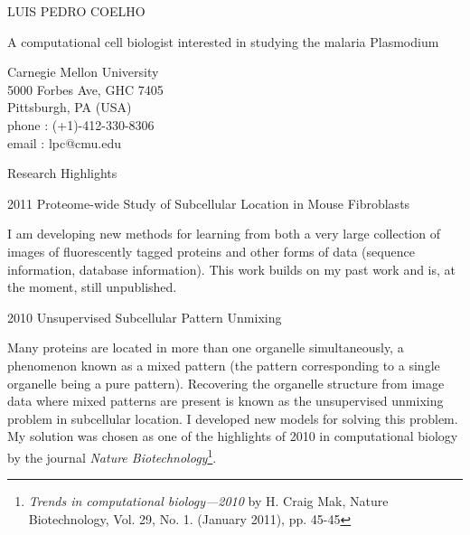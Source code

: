 \documentclass{article}
\renewcommand\section[1]{%
    \par\vspace{2em}%
    {\subhead #1}%
    \par\vspace{1em}%
}
\newcommand\cvitem[2][\relax]{%
    \par\vspace{.8em}
    \if\relax#1\else\textsc{#1}\hspace{1em}\fi%
    {\Textblack #2}%
    \par\vspace{.4em}
}
\begin{document}
\parindent=0cm

\begin{minipage}[t]{0.60\linewidth}%
\head \textcolor{darkg}{LUIS PEDRO COELHO}

\begin{minipage}[t]{0.70\linewidth}%
\raggedright\Quote\color{darkg} A computational cell biologist interested in studying the malaria Plasmodium
\end{minipage}
\end{minipage}
\hfill
\begin{minipage}[t]{0.26\textwidth}%
\vspace{-2.2em}
{\Contact%
\textcolor{medg}{
Carnegie Mellon University\\
5000 Forbes Ave, GHC 7405\\
Pittsburgh, PA (USA)}\\
\textcolor{darkg}{phone} : (+1)-412-330-8306\\
\textcolor{darkg}{email} : lpc@cmu.edu
}
\end{minipage}

\vspace{2.3em}

\section{Research Highlights}
\Text

\cvitem[2011]{Proteome-wide Study of Subcellular Location in Mouse Fibroblasts}
I am developing new methods for learning from both a very large collection of
images of fluorescently tagged proteins and other forms of data (sequence
information, database information). This work builds on my past work and is, at
the moment, still unpublished.

\cvitem[2010]{Unsupervised Subcellular Pattern Unmixing}
Many proteins are located in more than one organelle simultaneously, a
phenomenon known as a mixed pattern (the pattern corresponding to a single
organelle being a pure pattern). Recovering the organelle structure from image
data where mixed patterns are present is known as the unsupervised unmixing
problem in subcellular location. I developed new models for
solving this problem. My solution was chosen as one of the highlights of 2010
in computational biology by the journal \emph{Nature Biotechnology}\footnote{
\emph{Trends in computational biology—2010} by H. Craig Mak, Nature
Biotechnology, Vol. 29, No. 1. (January 2011), pp. 45-45}.
\end{document}
